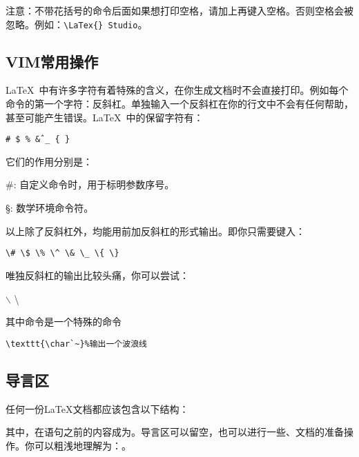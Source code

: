 注意：不带花括号的命令后面如果想打印空格，请加上{\color{cyan}{一对内部为空的花括号}}再键入空格。否则空格会被忽略。例如：\verb+\LaTex{} Studio+。
\subsection{VIM常用操作}
\LaTeX\ 中有许多字符有着特殊的含义，在你生成文档时不会直接打印。例如每个命令的第一个字符：反斜杠。单独输入一个反斜杠在你的行文中不会有任何帮助，甚至可能产生错误。\LaTeX\ 中的保留字符有：
\begin{center}
	\texttt{\# \$ \% \^ \& \_ \{ \} }
\end{center}

它们的作用分别是：
\begin{para}
\item[\#{}:]自定义命令时，用于标明参数序号。
\item[\S{}:]数学环境命令符。
\end{para}

以上除了反斜杠外，均能用前加反斜杠的形式输出。即你只需要键入：
\begin{center}
\verb|\# \$ \% \^ \& \_ \{ \}|
\end{center}

唯独反斜杠的输出比较头痛，你可以尝试：
\begin{codeshow}
$\backslash$ \textbackslash
\texttt{}
\end{codeshow}

其中命令是一个特殊的命令
\begin{verbatim}
\texttt{\char`~}%输出一个波浪线
\end{verbatim}

\subsection{导言区}
任何一份\LaTeX{}文档都应该包含以下结构：
其中，在语句之前的内容成为。导言区可以留空，也可以进行一些、文档的准备操作。你可以粗浅地理解为：。\\

